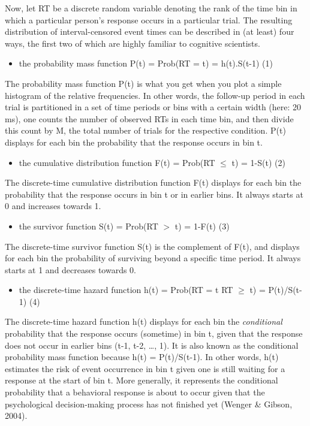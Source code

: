 \documentclass[
  english,
  man,floatsintext]{apa6}
\providecommand{\tightlist}{%
  \setlength{\itemsep}{0pt}\setlength{\parskip}{0pt}}
\begin{document}
Now, let RT be a discrete random variable denoting the rank of the time bin in which a particular person's response occurs in a particular trial. The resulting distribution of interval-censored event times can be described in (at least) four ways, the first two of which are highly familiar to cognitive scientists.

\begin{itemize}
\tightlist
\item
  the probability mass function P(t) = Prob(RT = t) = h(t).S(t-1) \hfill  (1)
\end{itemize}

The probability mass function P(t) is what you get when you plot a simple histogram of the relative frequencies. In other words, the follow-up period in each trial is partitioned in a set of time periods or bins with a certain width (here: 20 ms), one counts the number of observed RTs in each time bin, and then divide this count by M, the total number of trials for the respective condition. P(t) displays for each bin the probability that the response occurs in bin t.

\begin{itemize}
\tightlist
\item
  the cumulative distribution function F(t) = Prob(RT \(\leq\) t) = 1-S(t) \hfill  (2)
\end{itemize}

The discrete-time cumulative distribution function F(t) displays for each bin the probability that the response occurs in bin t or in earlier bins. It always starts at 0 and increases towards 1.

\begin{itemize}
\tightlist
\item
  the survivor function S(t) = Prob(RT \(>\) t) = 1-F(t) \hfill  (3)
\end{itemize}

The discrete-time survivor function S(t) is the complement of F(t), and displays for each bin the probability of surviving beyond a specific time period.
It always starts at 1 and decreases towards 0.

\begin{itemize}
\tightlist
\item
  the discrete-time hazard function h(t) = Prob(RT = t\textbar{} RT \(\geq\) t) = P(t)/S(t-1) \hfill  (4)
\end{itemize}

The discrete-time hazard function h(t) displays for each bin the \emph{conditional} probability that the response occurs (sometime) in bin t, given that the response does not occur in earlier bins (t-1, t-2, \ldots, 1). It is also known as the conditional probability mass function because h(t) = P(t)/S(t-1). In other words, h(t) estimates the risk of event occurrence in bin t given one is still waiting for a response at the start of bin t. More generally, it represents the conditional probability that a behavioral response is about to occur given that the psychological decision-making process has not finished yet (Wenger \& Gibson, 2004).
\end{document}
